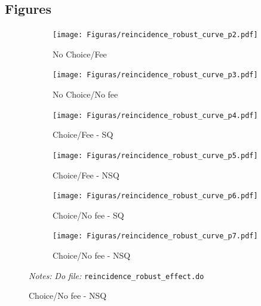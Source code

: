 \documentclass[11pt]{article}
\begin{document}
\subsection{Figures}


\begin{figure}[H]
    \caption{Robustness check effect of arms in reincidence}
    \label{robust_reincidence}
    \begin{center}
    \begin{subfigure}{0.49\textwidth}
        \caption{ No Choice/Fee}
        \centering
        \texttt{[image: Figuras/reincidence\_robust\_curve\_p2.pdf]}
    \end{subfigure}
     \begin{subfigure}{0.49\textwidth}
      \caption*{No Choice/No fee}
        \centering
        \texttt{[image: Figuras/reincidence\_robust\_curve\_p3.pdf]}
    \end{subfigure}
    
     \begin{subfigure}{0.49\textwidth}
        \caption{Choice/Fee - SQ}
        \centering
        \texttt{[image: Figuras/reincidence\_robust\_curve\_p4.pdf]}
    \end{subfigure}
     \begin{subfigure}{0.49\textwidth}
      \caption*{Choice/Fee - NSQ}
        \centering
        \texttt{[image: Figuras/reincidence\_robust\_curve\_p5.pdf]}
    \end{subfigure}
    
    \begin{subfigure}{0.49\textwidth}
        \caption{Choice/No fee - SQ}
        \centering
        \texttt{[image: Figuras/reincidence\_robust\_curve\_p6.pdf]}
    \end{subfigure}
     \begin{subfigure}{0.49\textwidth}
      \caption*{Choice/No fee - NSQ}
        \centering
        \texttt{[image: Figuras/reincidence\_robust\_curve\_p7.pdf]}
    \end{subfigure}
    \end{center}
     \footnotesize \textit{Notes: } 
      \footnotesize{ \textit{Do file: }  \texttt{reincidence\_robust\_effect.do}}
\end{figure}


\pagebreak
\end{document}
